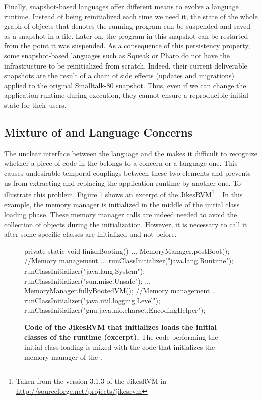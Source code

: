 Finally, snapshot-based languages offer different means to evolve a language runtime. Instead of being reinitialized each time we need it, the state of the whole graph of objects that denotes the running program can be suspended and saved as a snapshot in a file. Later on, the program in this snapshot can be restarted from the point it was suspended. As a consequence of this persistency property, some snapshot-based languages such as Squeak or Pharo  do not have the infrastructure to be reinitialized from scratch. Indeed, their current deliverable snapshots are the result of a chain of side effects (updates and migrations) applied to the original Smalltalk-80 snapshot. Thus, even if we can change the application runtime during execution, they cannot ensure a reproducible initial state for their users.

\subsection{Mixture of \VM and Language Concerns}

The unclear interface between the language and the \VM makes it difficult to recognize whether a piece of code in the \VM belongs to a \VM concern or a language one. This causes undesirable temporal couplings between these two elements and prevents us from extracting and replacing the application runtime by another one.
To illustrate this problem, Figure \ref{code:jikes_vm_initialization} shows an excerpt of the JikesRVM\footnote{Taken from the version 3.1.3 of the JikesRVM in \url{http://sourceforge.net/projects/jikesrvm}}~\cite{Alpe00a}. In this example, the memory manager is initialized in the middle of the initial class loading phase. These memory manager calls are indeed needed to avoid the collection of objects during the initialization. However, it is necessary to call it after some specific classes are initialized and not before.

\begin{figure}[ht]
\begin{code}
private static void finishBooting() {
    ...
    MemoryManager.postBoot(); //Memory management
    ...
    runClassInitializer("java.lang.Runtime");
    runClassInitializer("java.lang.System");
    runClassInitializer("sun.misc.Unsafe");
    ...
    MemoryManager.fullyBootedVM(); //Memory management
    ...
    runClassInitializer("java.util.logging.Level");
    runClassInitializer("gnu.java.nio.charset.EncodingHelper");
}
\end{code}
\caption{\textbf{Code of the JikesRVM that initializes loads the initial classes of the runtime (excerpt).} The code performing the initial class loading is mixed with the code that initializes the memory manager of the \VM.\label{code:jikes_vm_initialization}}
\end{figure}

